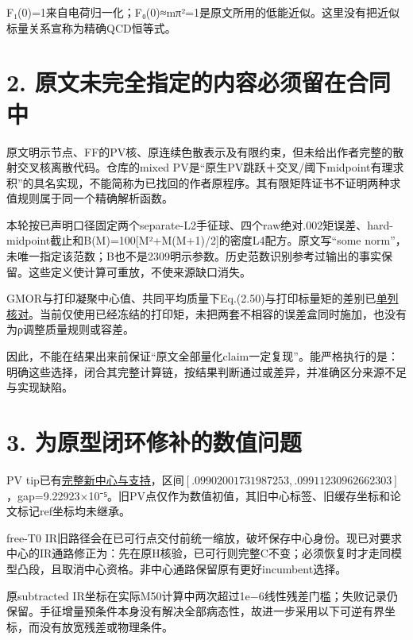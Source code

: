 \documentclass[
  10pt,
  a4paper,
]{article}
\begin{document}
F₁(0)=1来自电荷归一化；F₀(0)≈mπ²=1是原文所用的低能近似。这里没有把近似标量关系宣称为精确QCD恒等式。

\section{2.
原文未完全指定的内容必须留在合同中}\label{ux539fux6587ux672aux5b8cux5168ux6307ux5b9aux7684ux5185ux5bb9ux5fc5ux987bux7559ux5728ux5408ux540cux4e2d}

原文明示节点、FF的PV核、原连续色散表示及有限约束，但未给出作者完整的散射交叉核离散代码。仓库的mixed
PV是``原生PV跳跃＋交叉/阈下midpoint有理求积''的具名实现，不能简称为已找回的作者原程序。其有限矩阵证书不证明两种求值规则属于同一个精确解析函数。

本轮按已声明口径固定两个separate-L2手征球、四个raw绝对.002矩误差、hard-midpoint截止和B(M)=100{[}M²+M(M+1)/2{]}的密度L4配方。原文写``some
norm''，未唯一指定该范数；B也不是2309明示参数。历史范数识别参考过输出的事实保留。这些定义使计算可重放，不使来源缺口消失。

GMOR与打印凝聚中心值、共同平均质量下Eq.(2.50)与打印标量矩的差别已\href{../MAINLINE_SOURCE_REVIEW.md}{单列核对}。当前仅使用已经冻结的打印矩，未把两套不相容的误差盒同时施加，也没有为ρ调整质量规则或容差。

因此，不能在结果出来前保证``原文全部量化claim一定复现''。能严格执行的是：明确这些选择，闭合其完整计算链，按结果判断通过或差异，并准确区分来源不足与实现缺陷。

\section{3.
为原型闭环修补的数值问题}\label{ux4e3aux539fux578bux95edux73afux4feeux8865ux7684ux6570ux503cux95eeux9898}

PV
tip已有\href{../PV_tip_support_01/report.json}{完整新中心与支持}，区间\([.09902001731987253,\allowbreak .09911230962662303]\)，\newline gap=9.22923×10⁻⁵。旧PV点仅作为数值初值，其旧中心标签、旧缓存坐标和论文标记ref坐标均未继承。

free-T0
IR旧路径会在已可行点交付前统一缩放，破坏保存中心身份。现已对要求中心的IR通路修正为：先在原H核验，已可行则完整C不变；必须恢复时才走同模型凸段，且取消中心资格。非中心通路保留原有更好incumbent选择。

原subtracted
IR坐标在实际M50计算中两次超过1e−6线性残差门槛；失败记录仍保留。手征增量预条件本身没有解决全部病态性，故进一步采用以下可逆有界坐标，而没有放宽残差或物理条件。
\end{document}
